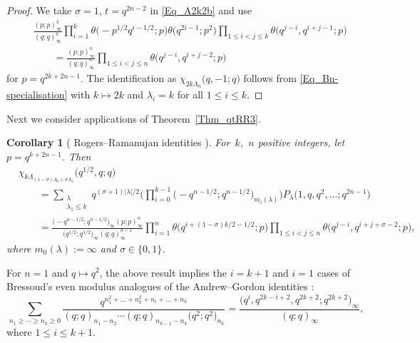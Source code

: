 \documentclass[pdftex]{sigma}
\numberwithin{equation}{section}
\newtheorem{Corollary}[Theorem]{Corollary}
\renewcommand{\leq}{\leqslant}
\renewcommand{\geq}{\geqslant}
\newcommand{\abs}[1]{\vert#1\vert}
\newcommand{\la}{\lambda}
\newcommand{\La}{\Lambda}
\begin{document}
\begin{proof}
We take $\sigma=1$, $t=q^{2n-2}$ in \eqref{Eq_A2k2b} and use
\begin{align*}
&\frac{(p;p)_{\infty}^k}{(q;q)_{\infty}^k}
\prod_{i=1}^k \theta\bigl({-}p^{1/2}q^{i-1/2};p\bigr)
\theta\bigl(q^{2i-1};p^2\bigr)
\prod_{1\leq i<j\leq k}\theta\bigl(q^{j-i},q^{i+j-1};p\bigr) \\
&\qquad=\frac{(p;p)_{\infty}^n}{(q;q)_{\infty}^n}
\prod_{1\leq i<j\leq n} \theta\bigl(q^{j-i},q^{i+j-2};p\bigr)
\end{align*}
for $p=q^{2k+2n-1}$.
The identification as $\chi_{2k\La_n}\bigl(q,-1;q\bigr)$
follows from \eqref{Eq_Bn-specialisation} with $k\mapsto 2k$
and $\la_i=k$ for all $1\leq i\leq k$.
\end{proof}

Next we consider applications of Theorem~\ref{Thm_qtRR3}.

\begin{Corollary}[ Rogers--Ramanujan identities
{\cite[Theorem 5.15 and~Remark 5.16]{RW21}}]
For~$k$,~$n$ positive integers, let $p=q^{k+2n-1}$.
Then
\begin{align*}
&\chi_{k\La_{(1-\sigma)\La_0+\sigma\La_n}}\bigl(q^{1/2},q;q\bigr) \\
&\qquad=
\sum_{\substack{\la \\[1pt] \la_1\leq k}}
q^{(\sigma+1)\abs{\la}/2}
\Biggl(\prod_{i=0}^{k-1}\bigl({-}q^{n-1/2};q^{n-1/2}\bigr)_{m_i(\la)}\Biggr)
P_{\la}\bigl(1,q,q^2,\dots;q^{2n-1}\bigr) \\
&\qquad=\frac{\bigl(-q^{n-1/2};q^{n-1/2}\bigr)_{\infty}(p;p)_{\infty}^n}
{\bigl(q^{1/2};q^{1/2}\bigr)_{\infty}(q;q)_{\infty}^{n-1}}
\prod_{i=1}^n \theta\bigl(q^{i+(1-\sigma)k/2-1/2};p\bigr)
\prod_{1\leq i<j\leq n} \theta\bigl(q^{j-i},q^{i+j+\sigma-2};p\bigr),
\end{align*}
where $m_0(\la):=\infty$ and $\sigma\in\{0,1\}$.
\end{Corollary}

For $n=1$ and $q\mapsto q^2$, the above result implies the $i=k+1$
and $i=1$ cases of Bressoud's even modulus analogues
of the Andrew--Gordon identities \cite{Bressoud80,Bressoud80b}:
\[
\sum_{n_1\geq\cdots\geq n_k\geq 0}
\frac{q^{n_1^2+\dots+n_k^2+n_i+\dots+n_k}}
{(q;q)_{n_1-n_2}\cdots(q;q)_{n_{k-1}-n_k}\bigl(q^2;q^2\bigr)_{n_k}}
=\frac{\bigl(q^i,q^{2k-i+2},q^{2k+2};q^{2k+2}\bigr)_{\infty}}
{(q;q)_{\infty}},
\]
where $1\leq i\leq k+1$.
\end{document}
